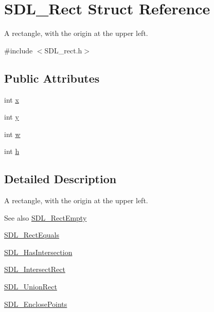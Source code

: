 \hypertarget{struct_s_d_l___rect}{}\section{S\+D\+L\+\_\+\+Rect Struct Reference}
\label{struct_s_d_l___rect}


A rectangle, with the origin at the upper left.  




{\ttfamily \#include $<$S\+D\+L\+\_\+rect.\+h$>$}

\subsection*{Public Attributes}
\begin{DoxyCompactItemize}
\item 
int \hyperlink{struct_s_d_l___rect_a85418d94621dd6855805c4b5c7bf6482}{x}
\item 
int \hyperlink{struct_s_d_l___rect_a822694af8ddca5fd0d5d94e47106ab85}{y}
\item 
int \hyperlink{struct_s_d_l___rect_a56b7be5738fb6fab86881534a814c45e}{w}
\item 
int \hyperlink{struct_s_d_l___rect_a0a17d46b320af8063b746153348edd72}{h}
\end{DoxyCompactItemize}


\subsection{Detailed Description}
A rectangle, with the origin at the upper left. 

\begin{DoxySeeAlso}{See also}
\hyperlink{_s_d_l__rect_8h_aac0e9b5d3f34baec6a2cde95bb01f49c}{S\+D\+L\+\_\+\+Rect\+Empty} 

\hyperlink{_s_d_l__rect_8h_a156979fd3561cf90b87741d11057262a}{S\+D\+L\+\_\+\+Rect\+Equals} 

\hyperlink{_s_d_l__rect_8h_a191ec0b069421d4a36304b475697e847}{S\+D\+L\+\_\+\+Has\+Intersection} 

\hyperlink{_s_d_l__rect_8h_aff8e3dd3b1a25443cd7c8cf02a087290}{S\+D\+L\+\_\+\+Intersect\+Rect} 

\hyperlink{_s_d_l__rect_8h_a659f2c25335202888408c95195823f9c}{S\+D\+L\+\_\+\+Union\+Rect} 

\hyperlink{_s_d_l__rect_8h_afcbb58dbba760b9e6fdb4b5d1ece015c}{S\+D\+L\+\_\+\+Enclose\+Points} 
\end{DoxySeeAlso}


